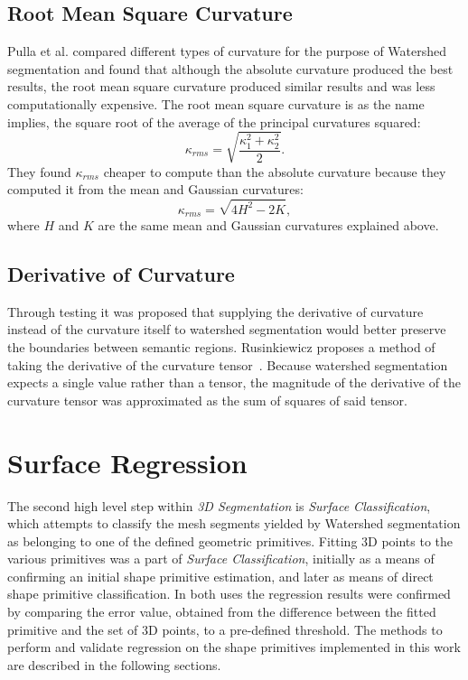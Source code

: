 \subsection{Root Mean Square Curvature}
Pulla et al. compared different types of curvature for the purpose of Watershed segmentation and found that although the absolute curvature produced the best results, the root mean square curvature produced similar results and was less computationally expensive.
The root mean square curvature is as the name implies, the square root of the average of the principal curvatures squared:
\begin{equation}
	\kappa_{rms} = \sqrt{\frac{\kappa_1^2 + \kappa_2^2}{2}}.
\end{equation}
They found $\kappa_{rms}$ cheaper to compute than the absolute curvature because they computed it from the mean and Gaussian curvatures:
\begin{equation*}
	\kappa_{rms} = \sqrt{4H^2 - 2K},
\end{equation*}
where $H$ and $K$ are the same mean and Gaussian curvatures explained above.

\subsection{Derivative of Curvature}
Through testing it was proposed that supplying the derivative of curvature instead of the curvature itself to watershed segmentation would better preserve the boundaries between semantic regions.
Rusinkiewicz proposes a method of taking the derivative of the curvature tensor~\cite{SRTensor}.
Because watershed segmentation expects a single value rather than a tensor, the magnitude of the derivative of the curvature tensor was approximated as the sum of squares of said tensor.

\section{Surface Regression}
The second high level step within \textit{3D Segmentation} is \textit{Surface Classification}, which attempts to classify the mesh segments yielded by Watershed segmentation as belonging to one of the defined geometric primitives.
Fitting 3D points to the various primitives was a part of \textit{Surface Classification}, initially as a means of confirming an initial shape primitive estimation, and later as means of direct shape primitive classification.
In both uses the regression results were confirmed by comparing the error value, obtained from the difference between the fitted primitive and the set of 3D points, to a pre-defined threshold.
The methods to perform and validate regression on the shape primitives implemented in this work are described in the following sections.

